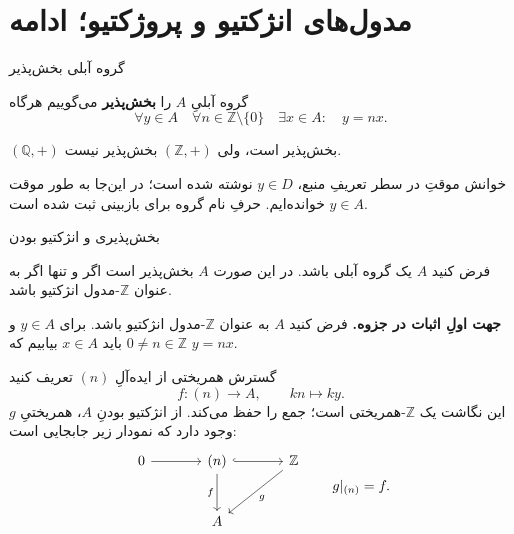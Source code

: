 \section{مدول‌های انژکتیو و پروژکتیو؛ ادامه}

\begin{frame}[t]{گروه آبلی بخش‌پذیر}
  \label{lec18:divisible-definition}
  \begin{definition}
    گروه آبلیِ $A$ را \textbf{بخش‌پذیر}  می‌گوییم هرگاه
    \[
      \forall y\in A\quad\forall n\in\mathbb Z\setminus\{0\}
      \quad\exists x\in A:\quad y=nx.
    \]
  \end{definition}
  \begin{example}
    $(\mathbb Q,+)$ بخش‌پذیر است، ولی $(\mathbb Z,+)$ بخش‌پذیر نیست.
  \end{example}
  \begin{alertblock}{خوانش موقتِ }
    در سطر تعریفِ منبع، $y\in D$ نوشته شده است؛ در این‌جا به طور موقت
    $y\in A$ خوانده‌ایم. حرفِ نام گروه برای بازبینی ثبت شده است.
  \end{alertblock}
\end{frame}

\begin{frame}[t]{بخش‌پذیری و انژکتیو بودن}
  \label{lec18:divisible-iff-injective}
  \begin{theorem}
    فرض کنید $A$ یک گروه آبلی باشد. در این صورت
    $A$ بخش‌پذیر است اگر و تنها اگر به عنوان $\mathbb Z$-مدول انژکتیو باشد.
  \end{theorem}
  \textbf{جهت اولِ اثبات در جزوه.}
  فرض کنید $A$ به عنوان $\mathbb Z$-مدول انژکتیو باشد.
  برای $y\in A$ و $0\ne n\in\mathbb Z$ باید $x\in A$ بیابیم که $y=nx$.
\end{frame}

\begin{frame}[t]{گسترش همریختی از ایده‌آلِ $(n)$}
  \label{lec18:injective-divisible-extension}
  تعریف کنید
  \[
    f:(n)\longrightarrow A,\qquad kn\longmapsto ky.
  \]
  این نگاشت یک $\mathbb Z$-همریختی است؛ جمع را حفظ می‌کند.
  از انژکتیو بودنِ $A$، همریختیِ $g$ وجود دارد که نمودار زیر جابجایی است:
  \[
    \begin{tikzcd}[ampersand replacement=\&,column sep=large,row sep=large]
      0 \arrow[r] \& (n) \arrow[r,hook] \arrow[d,"f"']
        \& \mathbb Z \arrow[dl,"g"] \\
      \& A \&
    \end{tikzcd}
    \qquad g|_{(n)}=f.
  \]
\end{frame}

